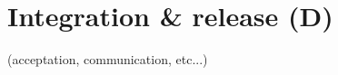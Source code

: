 
\section{Integration \& release (D)}
\label{sec:integration-release}
(acceptation, communication, etc...)
